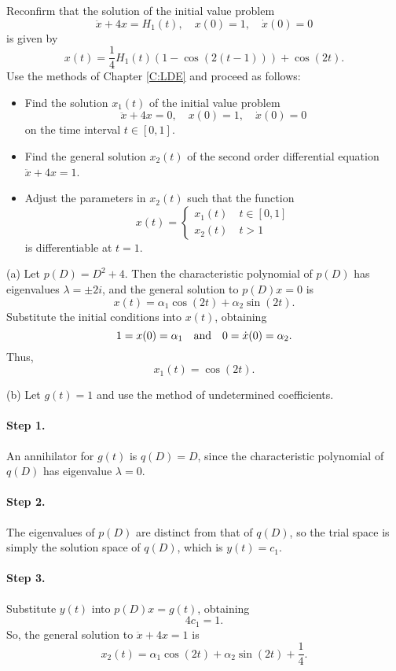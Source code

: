 \documentclass{ximera}
\begin{document}
\begin{exercise} \label{c13.4.2}
Reconfirm that the solution of the initial value problem
\[
\ddot x + 4 x=H_1(t),\quad x(0)=1,\quad \dot x(0)=0
\]
is given by
\[
x(t)=\frac{1}{4}H_1(t)(1-\cos(2(t-1))) + \cos(2t).
\]
Use the methods of Chapter \ref{C:LDE} and proceed as follows:
\begin{itemize}
\item[(a)] Find the solution $x_1(t)$ of the initial value problem
\[
\ddot x + 4 x=0,\quad x(0)=1,\quad \dot x(0)=0
\]
on the time interval $t\in[0,1]$.
\item[(b)] Find the general solution $x_2(t)$ of the second order
differential equation $\ddot x + 4 x=1$.
\item[(c)] Adjust the parameters in $x_2(t)$ such that the function
\[
x(t)=\left\{ \begin{array}{l} x_1(t)\quad t\in[0,1]\\
x_2(t) \quad t>1 \end{array}\right.
\]
is differentiable at $t=1$.
\end{itemize}

\begin{solution}

(a) Let $p(D) = D^2 + 4$.  Then the characteristic polynomial of
$p(D)$ has eigenvalues $\lambda = \pm 2i$, and the general solution to
$p(D)x = 0$ is
\[
x(t) = \alpha_1\cos(2t) + \alpha_2\sin(2t).
\]
Substitute the initial conditions into $x(t)$, obtaining
\[
1 = x(0) = \alpha_1 \quad\mbox{and}\quad
0 = \dot{x}(0) = \alpha_2.
\]
Thus,
\[
x_1(t) = \cos(2t).
\]

(b) Let $g(t) = 1$ and use the method of undetermined coefficients.
\paragraph{Step 1.} An annihilator for $g(t)$ is $q(D) = D$, since
the characteristic polynomial of $q(D)$ has eigenvalue $\lambda = 0$.

\paragraph{Step 2.} The eigenvalues of $p(D)$ are distinct from that
of $q(D)$, so the trial space is simply the solution space of $q(D)$,
which is $y(t) = c_1$.

\paragraph{Step 3.} Substitute $y(t)$ into $p(D)x = g(t)$, obtaining
\[
4c_1 = 1.
\]
So, the general solution to $\ddot{x} + 4x = 1$ is
\[
x_2(t) = \alpha_1\cos(2t) + \alpha_2\sin(2t) + \frac{1}{4}.
\]


\end{solution}
\end{exercise}
\end{document}
